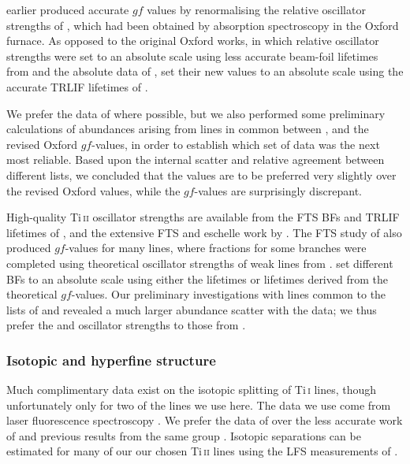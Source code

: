 \documentclass[traditabstract]{aa}
\begin{document}
\citet{Grevesse89} earlier produced accurate $gf$ values by renormalising the relative oscillator strengths of \citet{Blackwell2, Blackwell1, Blackwell3, Blackwell4}, which had been obtained by absorption spectroscopy in the Oxford furnace.  As opposed to the original Oxford works, in which relative oscillator strengths were set to an absolute scale using less accurate beam-foil lifetimes from \citet{Roberts73b} and the absolute data of \citet{Bell75}, \citet{Grevesse89} set their new values to an absolute scale using the accurate TRLIF lifetimes of \citet{Rudolph82}.  

We prefer the data of \citet{Lawler13} where possible, but we also performed some preliminary calculations of abundances arising from lines in common between \citet{Nitz98}, \citet{BW06} and the revised Oxford $gf$-values, in order to establish which set of data was the next most reliable.  Based upon the internal scatter and relative agreement between different lists, we concluded that the \citeauthor{Nitz98} values are to be preferred very slightly over the revised Oxford values, while the \citeauthor{BW06} $gf$-values are surprisingly discrepant. 

High-quality Ti\,\textsc{ii} oscillator strengths are available from the FTS BFs and TRLIF lifetimes of \citet{Bizzarri93}, and the extensive FTS and eschelle work by \citet{Wood13}.  The FTS study of \citet{Pickering01} also produced $gf$-values for many lines, where fractions for some branches were
completed using theoretical oscillator strengths of weak lines from \citet{Kuruczweb}.  \citeauthor{Pickering01} set different 
BFs to an absolute scale using either the \citeauthor{Bizzarri93} lifetimes or lifetimes derived from the theoretical
\citeauthor{Kuruczweb} $gf$-values.  Our preliminary investigations with lines common to the lists of \citet{Bizzarri93} and \citet{Pickering01}
revealed a much larger abundance scatter with the \citeauthor{Pickering01} data; we thus prefer the
\citet{Wood13} and \citeauthor{Bizzarri93} oscillator strengths to those from \citet{Pickering01}.

\subsubsection{Isotopic and hyperfine structure}
\label{Tihfs}

Much complimentary data exist on the isotopic splitting of Ti\,\textsc{i} lines, though unfortunately only for two of the
lines we use here.  The data we use come from laser fluorescence spectroscopy \citep[LFS, also known simply as laser-induced
fluorescence, LIF;][]{Gangrsky95}.  We prefer the data of \citeauthor{Gangrsky95} over the less accurate work of
\citet{Cruz94} and previous results from the same group \citep{Anastassov94}.  Isotopic separations can be estimated for many
of our our chosen Ti\,\textsc{ii} lines using the LFS measurements of \citet{Nouri10}. 
\end{document}
